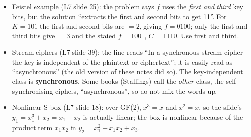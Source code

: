 \begin{fixbox}
\begin{itemize}
  \item Feistel example (L7 slide 25): the problem says $f$ uses the \emph{first and third} key bits, but the solution ``extracts the first and second bits to get 11''. For $K = 101$ the first and second bits are  $= 2$, giving $f = 0100$; only the first and third bits give  $= 3$ and the stated $f = 1001$, $C = 1110$. Use first and third.
  \item Stream ciphers (L7 slide 39): the line reads ``In a synchronous stream cipher the key is independent of the plaintext or ciphertext''; it is easily read as ``asynchronous'' (the old version of these notes did so). The key-independent class is \textbf{synchronous}. Some books (Stallings) call the \emph{other} class, the self-synchronising ciphers, ``asynchronous'', so do not mix the words up.
  \item Nonlinear S-box (L7 slide 18): over GF(2), $x^3 = x$ and $x^2 = x$, so the slide's $y_1 = x_1^3 + x_2 = x_1 + x_2$ is actually linear; the box is nonlinear because of the product term $x_1 x_2$ in $y_2 = x_1^2 + x_1x_2 + x_3$.
\end{itemize}
\end{fixbox}
